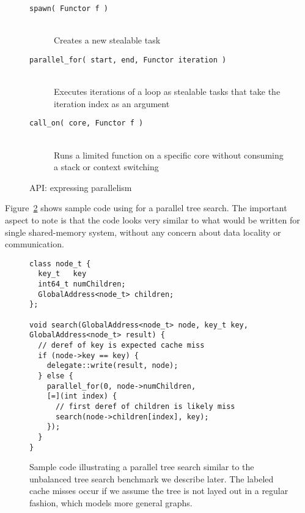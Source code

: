 \begin{figure}[htbp]
  \begin{center}
	\begin{description}
    \item[\texttt{spawn( Functor f )}] \hfill \\
      Creates a new stealable task
    \item[\texttt{parallel\_for( start, end, Functor iteration )}] \hfill \\
      Executes iterations of a loop as stealable tasks that
      take the iteration index as an argument
    \item[\texttt{call\_on( core, Functor f )}] \hfill \\
      Runs a limited function on a specific core without
      consuming a stack or context switching
	\end{description}
    \begin{minipage}{0.95\columnwidth}
      \caption{\label{fig:expressing-parallelism} \Grappa API: expressing parallelism
      } %
    \end{minipage}
  \end{center}
\end{figure}

Figure~\ref{fig:sample} shows sample code using \Grappa for a parallel tree
search. The important aspect to note is that the code looks very similar to
what would be written for single shared-memory system, without any concern about data locality or communication.

\begin{figure}[htbp]
\begin{center}
\begin{scriptsize}
\begin{lstlisting}[style=grappa]
class node_t {
  key_t   key
  int64_t numChildren;
  GlobalAddress<node_t> children;
};

void search(GlobalAddress<node_t> node, key_t key, GlobalAddress<node_t> result) {
  // deref of key is expected cache miss
  if (node->key == key) {
    delegate::write(result, node);
  } else {
    parallel_for(0, node->numChildren,
    [=](int index) {
      // first deref of children is likely miss
      search(node->children[index], key); 
    });
  }
}
\end{lstlisting}
\end{scriptsize}

    \begin{minipage}{0.95\columnwidth}
      \caption{\label{fig:sample} Sample \Grappa code illustrating a
          parallel tree search similar to the unbalanced tree search
          benchmark we describe later. The labeled cache misses occur
          if we assume the tree is not layed out in a regular fashion, which
      models more general graphs.}
    \end{minipage}

\end{center}
\end{figure}

